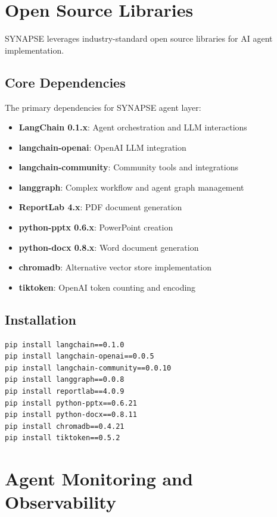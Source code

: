 \documentclass{report}
\begin{document}
\chapter{Open Source Libraries}

SYNAPSE leverages industry-standard open source libraries for AI agent implementation.

\section{Core Dependencies}

The primary dependencies for SYNAPSE agent layer:

\begin{itemize}
    \item \textbf{LangChain 0.1.x}: Agent orchestration and LLM interactions
    \item \textbf{langchain-openai}: OpenAI LLM integration
    \item \textbf{langchain-community}: Community tools and integrations
    \item \textbf{langgraph}: Complex workflow and agent graph management
    \item \textbf{ReportLab 4.x}: PDF document generation
    \item \textbf{python-pptx 0.6.x}: PowerPoint creation
    \item \textbf{python-docx 0.8.x}: Word document generation
    \item \textbf{chromadb}: Alternative vector store implementation
    \item \textbf{tiktoken}: OpenAI token counting and encoding
\end{itemize}

\section{Installation}

\begin{lstlisting}
pip install langchain==0.1.0
pip install langchain-openai==0.0.5
pip install langchain-community==0.0.10
pip install langgraph==0.0.8
pip install reportlab==4.0.9
pip install python-pptx==0.6.21
pip install python-docx==0.8.11
pip install chromadb==0.4.21
pip install tiktoken==0.5.2
\end{lstlisting}

\chapter{Agent Monitoring and Observability}
\end{document}
